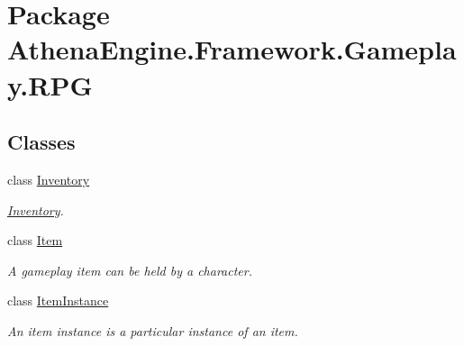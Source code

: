 \hypertarget{namespace_athena_engine_1_1_framework_1_1_gameplay_1_1_r_p_g}{\section{Package Athena\-Engine.\-Framework.\-Gameplay.\-R\-P\-G}
\label{namespace_athena_engine_1_1_framework_1_1_gameplay_1_1_r_p_g}
}
\subsection*{Classes}
\begin{DoxyCompactItemize}
\item 
class \hyperlink{class_athena_engine_1_1_framework_1_1_gameplay_1_1_r_p_g_1_1_inventory}{Inventory}
\begin{DoxyCompactList}\small\item\em \hyperlink{class_athena_engine_1_1_framework_1_1_gameplay_1_1_r_p_g_1_1_inventory}{Inventory}. \end{DoxyCompactList}\item 
class \hyperlink{class_athena_engine_1_1_framework_1_1_gameplay_1_1_r_p_g_1_1_item}{Item}
\begin{DoxyCompactList}\small\item\em A gameplay item can be held by a character. \end{DoxyCompactList}\item 
class \hyperlink{class_athena_engine_1_1_framework_1_1_gameplay_1_1_r_p_g_1_1_item_instance}{Item\-Instance}
\begin{DoxyCompactList}\small\item\em An item instance is a particular instance of an item. \end{DoxyCompactList}\end{DoxyCompactItemize}

